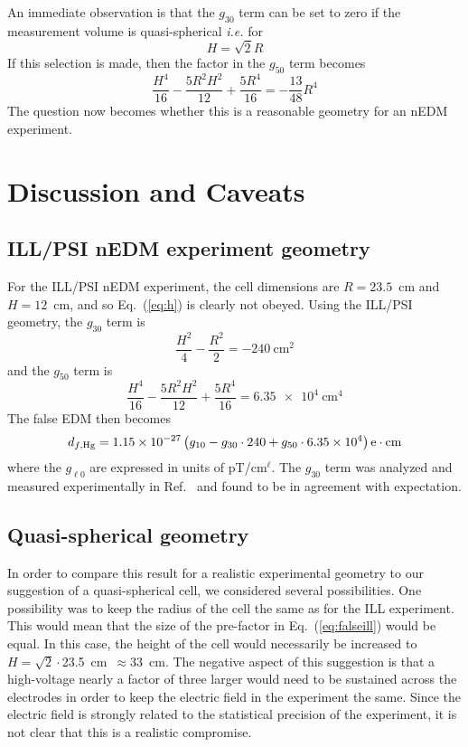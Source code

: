 \documentclass[preprint,12pt]{elsarticle}
\begin{document}
An immediate observation is that the $g_{30}$ term can be set to zero
if the measurement volume is quasi-spherical {\it i.e.} for
\begin{equation}
\label{eq:h}
H=\sqrt{2}R
\end{equation}
If this selection is made, then the factor in the $g_{50}$ term becomes
\begin{equation}
\frac{H^{4}}{16}-\frac{5R^2H^2}{12}+\frac{5R^4}{16}=-\frac{13}{48}R^4
\end{equation}
The question now becomes whether this is a reasonable geometry for an
nEDM experiment.

\section{Discussion and Caveats}

\subsection{ILL/PSI nEDM experiment geometry}

For the ILL/PSI nEDM experiment, the cell dimensions are $R=23.5$~cm
and $H=12$~cm, and so Eq.~(\ref{eq:h}) is clearly not obeyed.  Using
the ILL/PSI geometry, the $g_{30}$ term is
\begin{equation}
\frac{H^{2}}{4}-\frac{R^2}{2}=-240~\mathrm{cm}^2
\end{equation}
and the $g_{50}$ term is
\begin{equation}
\frac{H^{4}}{16}-\frac{5R^2H^2}{12}+\frac{5R^4}{16}=\num{6.35e4}~\mathrm{cm}^4
\end{equation}
The false EDM then becomes
\begin{equation}
\label{eq:falseill}
d_{f,\rm Hg} = \num{1.15e-27}\left(g_{10} - g_{30}\cdot240 +
g_{50}\cdot\num{6.35e4}\right)\mathrm{e}\cdot\mathrm{cm}
\end{equation}
where the $g_{\ell0}$ are expressed in units of pT/cm$^\ell$.  The
$g_{30}$ term was analyzed and measured experimentally in
Ref.~\cite{bib:komposch} and found to be in agreement with
expectation.

\subsection{Quasi-spherical geometry}

In order to compare this result for a realistic experimental geometry
to our suggestion of a quasi-spherical cell, we considered several
possibilities.  One possibility was to keep the radius of the cell the
same as for the ILL experiment.  This would mean that the size of the
pre-factor in Eq.~(\ref{eq:falseill}) would be equal.  In this case,
the height of the cell would necessarily be increased to
$H=\sqrt{2}\cdot$23.5~cm~$\approx 33$~cm.  The negative aspect of this
suggestion is that a high-voltage nearly a factor of three larger
would need to be sustained across the electrodes in order to keep the
electric field in the experiment the same.  Since the electric field
is strongly related to the statistical precision of the experiment, it
is not clear that this is a realistic compromise.
\end{document}
